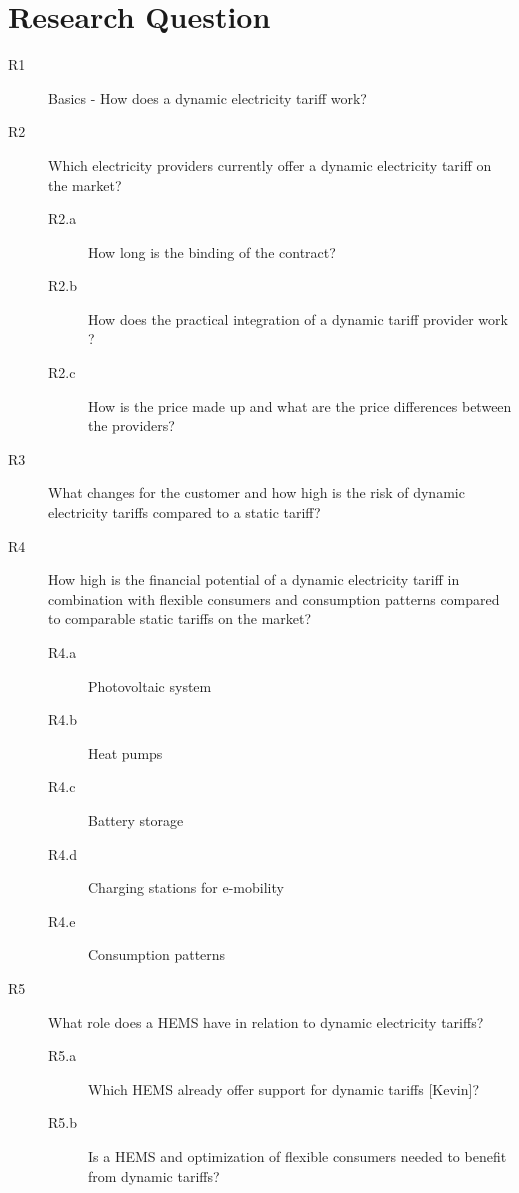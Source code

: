 \documentclass[conference, xcolor=dvipsnames]{IEEEtran}
\begin{document}
	\section{Research Question}
	\begin{description}
		\item [R1] Basics - How does a dynamic electricity tariff work?
		\item [R2] Which electricity providers currently offer a dynamic electricity tariff on the market?
			\begin{description}
			\item [R2.a] How long is the binding of the contract? 
			\item [R2.b] How does the practical integration of a dynamic tariff provider work ?
			\item [R2.c] How is the price made up and what are the price differences between the providers?
			\end{description}
		\item [R3] What changes for the customer and how high is the risk of dynamic electricity tariffs compared to a static tariff?
		\item [R4] How high is the financial potential of a dynamic electricity tariff in combination with flexible consumers and consumption patterns compared to comparable static tariffs on the market?
		\begin{description}
			\item [R4.a] Photovoltaic system
			\item [R4.b] Heat pumps
			\item [R4.c] Battery storage
			\item [R4.d] Charging stations for e-mobility
			\item [R4.e] Consumption patterns
		\end{description}
		\item [R5] What role does a HEMS have in relation to dynamic electricity tariffs?
		\begin{description}
		 \item [R5.a] Which HEMS already offer support for dynamic tariffs [Kevin]?
		\item [R5.b] Is a HEMS and optimization of flexible consumers needed to benefit from dynamic tariffs?
			\end{description}
		
	\end{description}

	
	
	
	
\end{document}
